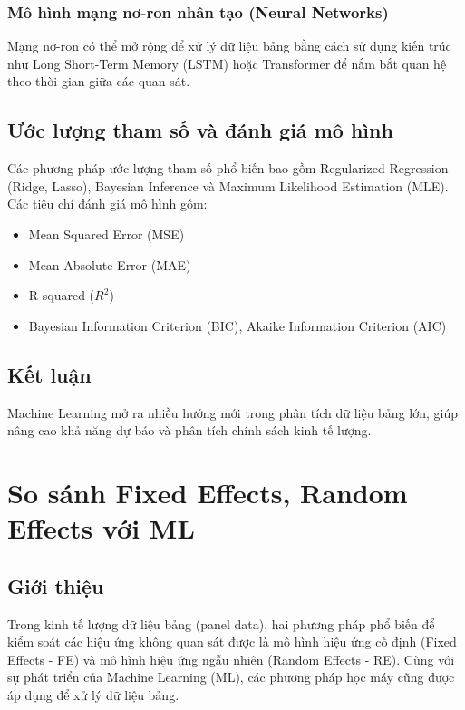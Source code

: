 \subsubsection{Mô hình mạng nơ-ron nhân tạo (Neural Networks)}
Mạng nơ-ron có thể mở rộng để xử lý dữ liệu bảng bằng cách sử dụng kiến trúc như Long Short-Term Memory (LSTM) hoặc Transformer để nắm bắt quan hệ theo thời gian giữa các quan sát.

\subsection{Ước lượng tham số và đánh giá mô hình}
Các phương pháp ước lượng tham số phổ biến bao gồm Regularized Regression (Ridge, Lasso), Bayesian Inference và Maximum Likelihood Estimation (MLE). Các tiêu chí đánh giá mô hình gồm:
\begin{itemize}
    \item Mean Squared Error (MSE)
    \item Mean Absolute Error (MAE)
    \item R-squared ($R^2$)
    \item Bayesian Information Criterion (BIC), Akaike Information Criterion (AIC)
\end{itemize}

\subsection{Kết luận}
Machine Learning mở ra nhiều hướng mới trong phân tích dữ liệu bảng lớn, giúp nâng cao khả năng dự báo và phân tích chính sách kinh tế lượng.




\section{So sánh Fixed Effects, Random Effects với ML}
\subsection{Giới thiệu}
Trong kinh tế lượng dữ liệu bảng (panel data), hai phương pháp phổ biến để kiểm soát các hiệu ứng không quan sát được là mô hình hiệu ứng cố định (Fixed Effects - FE) và mô hình hiệu ứng ngẫu nhiên (Random Effects - RE). Cùng với sự phát triển của Machine Learning (ML), các phương pháp học máy cũng được áp dụng để xử lý dữ liệu bảng.

